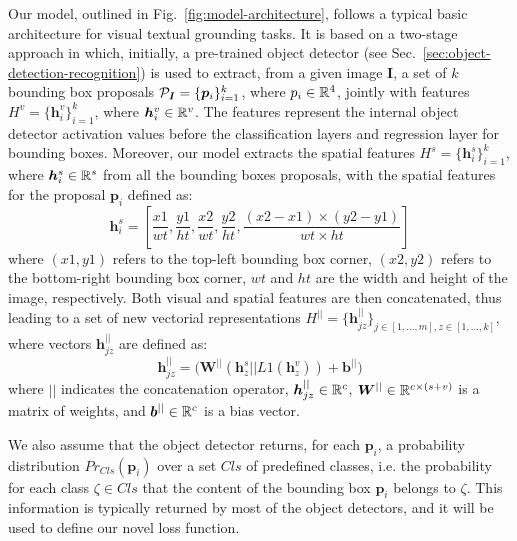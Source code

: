 Our model, outlined in Fig.~\ref{fig:model-architecture}, follows a
typical basic architecture for visual textual grounding tasks. It is
based on a two-stage approach in which, initially, a pre-trained
object detector (see Sec.~\ref{sec:object-detection-recognition}) is
used to extract, from a given image $\bm{I}$, a set of $k$ bounding
box proposals $\mathcal{P}_{\bm{I}} = \{ \bm{p}_i \}^k_{i=1}$, where $p_i
\in \mathbb{R}^4$, jointly with features $H^v = \{ \bm{h}^v_i \}^k_{i=1}$,
where $\bm{h}^v_i \in \mathbb{R}^v$. The features represent the internal
object detector activation values before the classification layers and
regression layer for bounding boxes. Moreover, our model extracts the
spatial features $H^s = \{ \bm{h}^s_i \}^k_{i=1}$, where $\bm{h}^s_i
\in \mathbb{R}^s$ from all the bounding boxes proposals, with the spatial
features for the proposal $\bm{p}_i$ defined as:
\begin{equation}
  \bm{h}^s_i = \left[ \frac{x1}{wt}, \frac{y1}{ht}, \frac{x2}{wt}, \frac{y2}{ht}, \frac{(x2 - x1) \times (y2 - y1)}{wt \times ht}  \right]
\end{equation}
where $(x1, y1)$ refers to the top-left bounding box corner, $(x2,
y2)$ refers to the bottom-right bounding box corner, $wt$ and $ht$ are
the width and height of the image, respectively. Both visual and
spatial features are then concatenated, thus leading to a set of new
vectorial representations $H^{||} = \{ \bm{h}^{||}_{jz} \}_{j \in [1,
\ldots, m], z \in [1, \ldots, k]}$, where vectors $\bm{h}^{||}_{jz}$
are defined as:
\begin{equation}
  \bm{h}^{||}_{jz} = \Big( \bm{W}^{||} \left( \bm{h}^s_z || L1(\bm{h}^v_z) \right) + \bm{b}^{||} \Big) 
\end{equation}
where $||$ indicates the concatenation operator, $\bm{h}^{||}_{jz} \in
\mathbb{R}^c$, $\bm{W}^{||} \in \mathbb{R}^{c \times (s + v)}$ is a matrix
of weights, and $\bm{b}^{||} \in \mathbb{R}^c$ is a bias vector.

We also assume that the object detector returns, for each $\bm{p}_i$,
a probability distribution $Pr_{Cls}(\bm{p}_i)$ over a set $Cls$ of
predefined classes, i.e. the probability for each class $\zeta \in
Cls$ that the content of the bounding box $\bm{p}_i$ belongs to
$\zeta$. This information is typically returned by most of the object
detectors, and it will be used to define our novel loss function.
